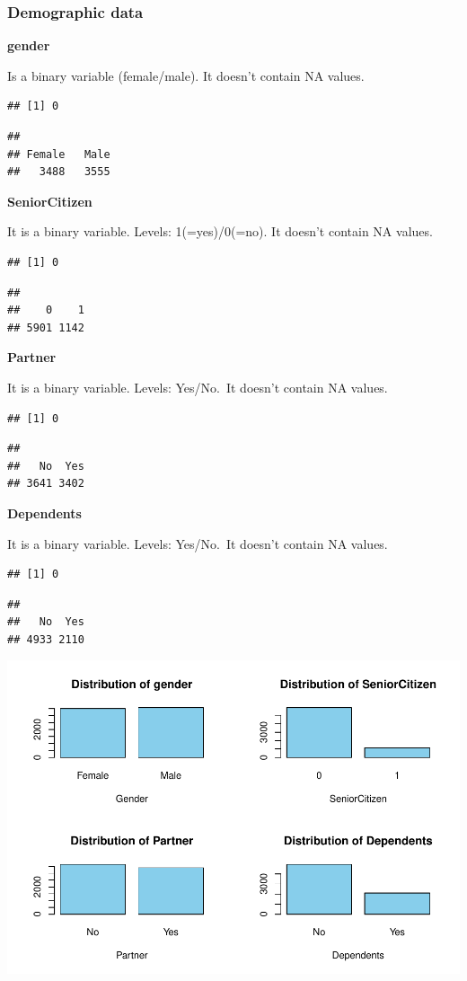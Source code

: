 \documentclass[
  twoside]{article}
\begin{document}
\hypertarget{demographic-data}{%
\subsubsection{\texorpdfstring{\textbf{Demographic
data}}{Demographic data}}\label{demographic-data}}

\textbf{gender}

Is a binary variable (female/male). It doesn't contain NA values.

\begin{verbatim}
## [1] 0
\end{verbatim}

\begin{verbatim}
## 
## Female   Male 
##   3488   3555
\end{verbatim}

\textbf{SeniorCitizen}

It is a binary variable. Levels: 1(=yes)/0(=no). It doesn't contain NA
values.

\begin{verbatim}
## [1] 0
\end{verbatim}

\begin{verbatim}
## 
##    0    1 
## 5901 1142
\end{verbatim}

\textbf{Partner}

It is a binary variable. Levels: Yes/No.~It doesn't contain NA values.

\begin{verbatim}
## [1] 0
\end{verbatim}

\begin{verbatim}
## 
##   No  Yes 
## 3641 3402
\end{verbatim}

\textbf{Dependents}

It is a binary variable. Levels: Yes/No.~It doesn't contain NA values.

\begin{verbatim}
## [1] 0
\end{verbatim}

\begin{verbatim}
## 
##   No  Yes 
## 4933 2110
\end{verbatim}

\includegraphics{Assigment2_files/figure-latex/unnamed-chunk-8-1.pdf}
\end{document}
